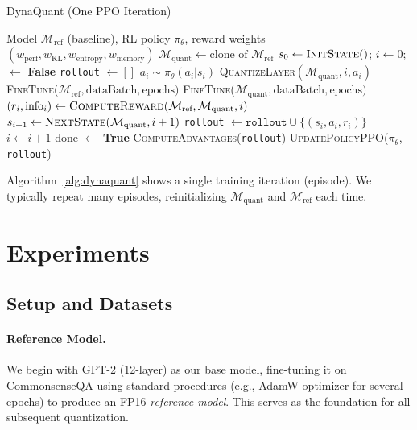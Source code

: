 \documentclass{article}
\begin{document}
	\begin{algorithm}[h]
		\footnotesize
		\caption{DynaQuant (One PPO Iteration)}
		\label{alg:dynaquant}
		\begin{algorithmic}[1]
			\REQUIRE Model $\mathcal{M}_\text{ref}$ (baseline), RL policy $\pi_\theta$, reward weights $(w_{\mathrm{perf}}, w_{\mathrm{KL}}, w_{\mathrm{entropy}}, w_{\mathrm{memory}})$
			\STATE $\mathcal{M}_\text{quant} \leftarrow \text{clone of } \mathcal{M}_\text{ref}$
			\STATE $s_0 \leftarrow \textsc{InitState}()$; $i \leftarrow 0$;  $\leftarrow$ \textbf{False}
			\STATE \texttt{rollout} $\leftarrow []$
			\STATE $a_i \sim \pi_\theta(a_i|s_i)$
			\STATE \textsc{QuantizeLayer}$(\mathcal{M}_\text{quant}, i, a_i)$
			\STATE \textsc{FineTune}($\mathcal{M}_\text{ref}, \text{dataBatch}, \text{epochs})$
			\STATE \textsc{FineTune}($\mathcal{M}_\text{quant}, \text{dataBatch}, \text{epochs})$
			\STATE $(r_i, \text{info}_i) \leftarrow \textsc{ComputeReward}(\mathcal{M}_\text{ref}, \mathcal{M}_\text{quant}, i)$
			\STATE $s_{i+1} \leftarrow \textsc{NextState}(\mathcal{M}_\text{quant}, i+1)$
			\STATE \texttt{rollout} $\leftarrow \texttt{rollout}\cup \{(s_i,a_i,r_i)\}$
			\STATE $i \leftarrow i+1$
			\STATE done $\leftarrow$ \textbf{True}
			\ENDIF
			\ENDWHILE
			\STATE \textsc{ComputeAdvantages}(\texttt{rollout})
			\STATE \textsc{UpdatePolicyPPO}($\pi_\theta$, \texttt{rollout})
		\end{algorithmic}
	\end{algorithm}
	
	Algorithm~\ref{alg:dynaquant} shows a single training iteration (episode). We typically repeat many episodes, reinitializing $\mathcal{M}_\text{quant}$ and $\mathcal{M}_\text{ref}$ each time.
	
	\section{Experiments}
	\label{sec:experiments}
	
	\subsection{Setup and Datasets}
	
	\paragraph{Reference Model.}
	We begin with GPT-2 (12-layer) as our base model, fine-tuning it on CommonsenseQA using standard procedures (e.g., AdamW optimizer for several epochs) to produce an FP16 \emph{reference model}. This serves as the foundation for all subsequent quantization.
	
\end{document}
